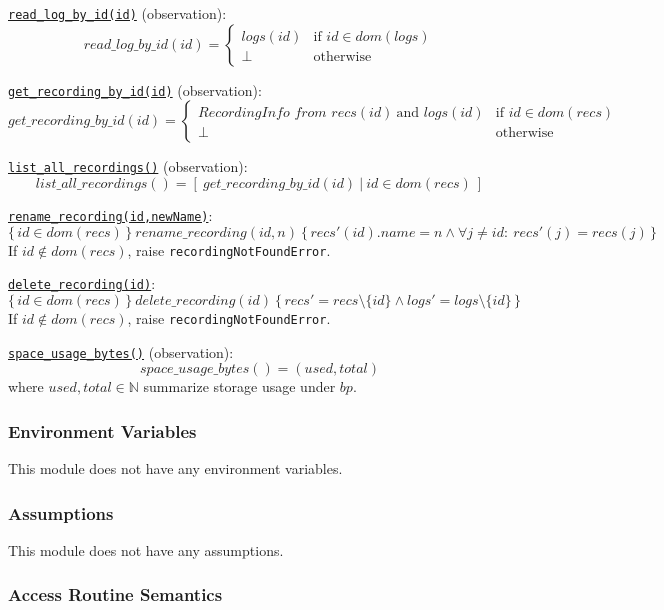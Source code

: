 \documentclass[12pt, titlepage]{article}
\begin{document}
\noindent\underline{\texttt{read\_log\_by\_id(id)}} (observation):
\[
  read\_log\_by\_id(id) =
  \begin{cases}
    logs(id) & \text{if } id \in dom(logs) \\
    \bot     & \text{otherwise}
  \end{cases}
\]

\noindent\underline{\texttt{get\_recording\_by\_id(id)}} (observation):
\[
  get\_recording\_by\_id(id) =
  \begin{cases}
    \textit{RecordingInfo from } recs(id)\ \text{and } logs(id) & \text{if } id \in dom(recs) \\
    \bot                                                        & \text{otherwise}
  \end{cases}
\]

\noindent\underline{\texttt{list\_all\_recordings()}} (observation):
\[
  list\_all\_recordings() = [\ get\_recording\_by\_id(id)\ |\ id \in dom(recs)\ ]
\]

\noindent\underline{\texttt{rename\_recording(id,newName)}}:
\[
  \{\, id \in dom(recs) \,\}\ rename\_recording(id,n)\ \{\, recs'(id).name = n \land \forall j\neq id:\ recs'(j)=recs(j) \,\}
\]
If \(id \notin dom(recs)\), raise \texttt{recordingNotFoundError}.

\noindent\underline{\texttt{delete\_recording(id)}}:
\[
  \{\, id \in dom(recs) \,\}\ delete\_recording(id)\ \{\, recs' = recs \setminus \{id\} \land logs' = logs \setminus \{id\} \,\}
\]
If \(id \notin dom(recs)\), raise \texttt{recordingNotFoundError}.

\noindent\underline{\texttt{space\_usage\_bytes()}} (observation):
\[
  space\_usage\_bytes() = (used,total)
\]
where \(used,total \in \mathbb{N}\) summarize storage usage under \(bp\).

\subsubsection{Environment Variables}

This module does not have any environment variables.

\subsubsection{Assumptions}

This module does not have any assumptions.

\subsubsection{Access Routine Semantics}
\end{document}
